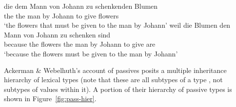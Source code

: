 \documentclass[output=paper
	        ,collection
	        ,collectionchapter
 	        ,biblatex
                ,babelshorthands
                ,newtxmath
                ,draftmode
                ,colorlinks, citecolor=brown
]{langscibook}
\begin{document}
\begin{exe}
	\ex\label{zu-pass}
	\begin{xlist}
		\ex\label{zu-pass-a}
		\gll die dem Mann von Johann zu schenkenden Blumen \\
		the the man by Johann to give flowers  \\
		\glt `the flowers that must be given to the man by Johann'
		\ex\label{zu-pass-b}
		\gll weil die Blumen den Mann von Johann zu schenken sind \\
		because the flowers the man by Johann to give are \\
		\glt `because the flowers must be given to the man by Johann'
	\end{xlist}
\end{exe}

Ackerman \& Webelhuth's account of  passives posits a multiple inheritance hierarchy of lexical types (note that these are all subtypes of a type , not subtypes of values within it). A portion of their hierarchy of  passive types is shown in Figure~\ref{fig:pass-hier}.
\end{document}
